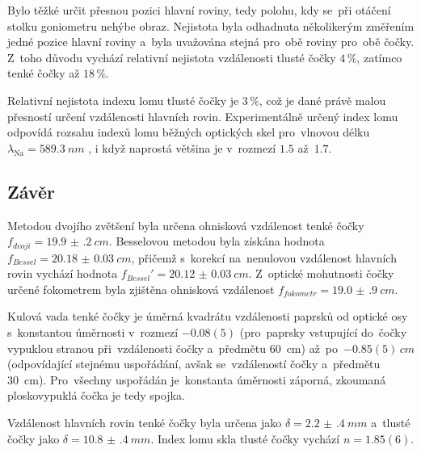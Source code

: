 \documentclass{../concepts/titul_zprava_p/prepareprotokolZprava} %
\begin{document}
Bylo těžké určit přesnou pozici hlavní roviny, tedy polohu, kdy se~při otáčení stolku goniometru nehýbe obraz.
Nejistota byla odhadnuta několikerým změřením jedné pozice hlavní roviny a~byla uvažována stejná pro~obě roviny pro~obě čočky.
Z~toho důvodu vychází relativní nejistota vzdálenosti tlusté čočky $4\,\%$, zatímco tenké čočky až $18\,\%$.

Relativní nejistota indexu lomu tlusté čočky je $3\,\%$, což je dané právě malou přesností určení vzdálenosti hlavních rovin.
Experimentálně určený index lomu odpovídá rozsahu indexů lomu běžných optických skel pro~vlnovou 
délku $\lambda_\mathrm{Na} = \qty{589.3}{nm}$ \cite{edmund}, i když naprostá většina je v~rozmezí $1.5$ až~$1.7$.


\subsection{Závěr}
Metodou dvojího zvětšení byla určena ohnisková vzdálenost tenké čočky $f_{dvoji} = \qty{19.9(2)}{cm}$. Besselovou metodou
byla získána hodnota $f_{Bessel} = \qty{20.18(3)}{cm}$, přičemž s~korekcí na~nenulovou vzdálenost hlavních rovin vychází hodnota
$f_{Bessel}' = \qty{20.12(3)}{cm}$. Z~optické mohutnosti čočky určené fokometrem byla zjištěna ohnisková vzdálenost 
$f_{fokometr} = \qty{19.0(9)}{cm}$. 

Kulová vada tenké čočky je úměrná kvadrátu vzdálenosti paprsků od optické osy
s~konstantou úměrnosti v~rozmezí $-0.08(5)$ (pro~paprsky vstupující do~čočky vypuklou stranou při~vzdálenosti čočky a~předmětu
\qty{60}{cm}) až~po~$-0.85(5)\,\unit{cm}$ (odpovídající stejnému uspořádání, avšak se~vzdáleností čočky a~předmětu \qty{30}{cm}).
Pro~všechny uspořádán je~konstanta úměrnosti záporná, zkoumaná ploskovypuklá čočka je tedy spojka.

Vzdálenost hlavních rovin tenké čočky byla určena jako $\delta = \qty{2.2(4)}{mm}$ a~tlusté čočky jako 
$\delta = \qty{10.8(4)}{mm}$. Index lomu skla tlusté čočky vychází $n = 1.85(6)$.
\end{document}
